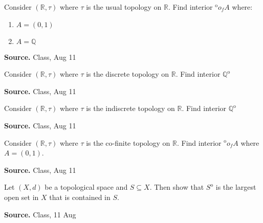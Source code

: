 \documentclass[12pt,twoside]{report}
\newenvironment*{source}{\hfill\scriptsize\textbf{Source.}\space}{\par}
\begin{document}
\begin{samepage}
\begin{ex}
Consider $\left (\mathbb{R}, \tau\right )$ where $\tau$ is the usual topology on $\mathbb{R}$.
Find interior $^\mathrm{o} o_f A$ where:
    \begin{enumerate}
        \item $A = \left (0,1\right )$
        \item $A = \mathbb{Q}$
    \end{enumerate}
\end{ex}
\begin{source}
Class, Aug 11
\end{source}
\end{samepage}

\begin{samepage}
\begin{ex}
Consider $\left (\mathbb{R}, \tau\right )$ where $\tau$ is the discrete topology on $\mathbb{R}$.
Find interior $\mathbb{Q} ^\mathrm{o}$
\end{ex}
\begin{source}
Class, Aug 11
\end{source}
\end{samepage}

\begin{samepage}
\begin{ex}
Consider $\left (\mathbb{R}, \tau\right )$ where $\tau$ is the indiscrete topology on $\mathbb{R}$.
Find interior $\mathbb{Q} ^\mathrm{o}$
\end{ex}
\begin{source}
Class, Aug 11
\end{source}
\end{samepage}

\begin{samepage}
\begin{ex}
Consider $\left (\mathbb{R}, \tau\right )$ where $\tau$ is the co-finite topology on $\mathbb{R}$.
Find interior $^\mathrm{o} o_f A$ where $A = \left (0,1\right )$.
\end{ex}
\begin{source}
Class, Aug 11
\end{source}
\end{samepage}

\begin{samepage}
\begin{ex}
Let $\left (X,d\right )$ be a topological space and $S \subseteq X$. Then show that $S ^\mathrm{o}$ is the largest open set in $X$ that is contained in $S$.
\end{ex}
\begin{source}
Class, 11 Aug
\end{source}
\end{samepage}
\end{document}
